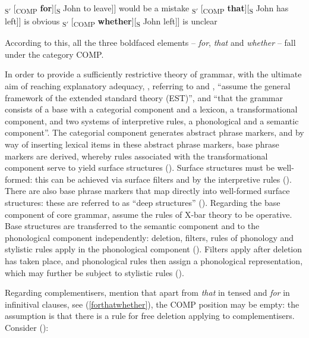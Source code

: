 \ea \label{forthatwhether}
\ea {[}\textsubscript{S$'$} [\textsubscript{COMP} \textbf{for}][\textsubscript{S} John to leave]] \underline{\hspace{1cm}} would be a mistake 
\ex {[}\textsubscript{S$'$} [\textsubscript{COMP} \textbf{that}][\textsubscript{S} John has left]] \underline{\hspace{1cm}} is obvious
\ex {[}\textsubscript{S$'$} [\textsubscript{COMP} \textbf{whether}][\textsubscript{S} John left]] \underline{\hspace{1cm}} is unclear
\z
\z

According to this, all the three boldfaced elements -- \textit{for}, \textit{that} and \textit{whether} -- fall under the category COMP.

In order to provide a sufficiently restrictive theory of grammar, with the ultimate aim of reaching explanatory adequacy, \citet[428]{chomskylasnik1977}, referring to \citet{jackendoff1972} and \citet{chomsky1972}, ``assume the general framework of the extended standard theory (EST)'', and ``that the grammar consists of a base with a categorial component and a lexicon, a transformational component, and two systems of interpretive rules, a phonological and a semantic component''. The categorial component generates abstract phrase markers, and by way of inserting lexical items in these abstract phrase markers, base phrase markers are derived, whereby rules associated with the transformational component serve to yield surface structures (\citealt[428]{chomskylasnik1977}). Surface structures must be well-formed: this can be achieved via surface filters and by the interpretive rules (\citealt[428]{chomskylasnik1977}). There are also base phrase markers that map directly into well-formed surface structures: these are referred to as ``deep structures'' (\citealt[428]{chomskylasnik1977}). Regarding the base component of core grammar, \citet[430--431]{chomskylasnik1977} assume the rules of X-bar theory to be operative. Base structures are transferred to the semantic component and to the phonological component independently: deletion, filters, rules of phonology and stylistic rules apply in the phonological component (\citealt[431]{chomskylasnik1977}). Filters apply after deletion has taken place, and phonological rules then assign a phonological representation, which may further be subject to stylistic rules (\citealt[433]{chomskylasnik1977}).

Regarding complementisers, \citet[434]{chomskylasnik1977} mention that apart from \textit{that} in tensed and \textit{for} in infinitival clauses, see (\ref{forthatwhether}), the COMP position may be empty: the assumption is that there is a rule for free deletion applying to complementisers. Consider (\citealt[434, ex. 13]{chomskylasnik1977}):

